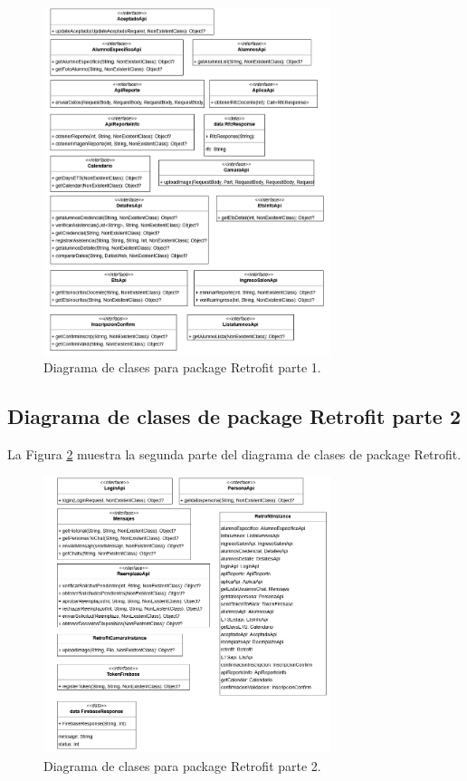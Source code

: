 \begin{figure}[htbp!]
	\begin{center}
		\includegraphics[width=0.75\textwidth]{DiagramasMoviles/DCM (10)}
		\caption{Diagrama de clases para package Retrofit parte 1.}
		\label{fig:Retrofit1}
	\end{center}
\end{figure}

\newpage

\subsection{Diagrama de clases de package Retrofit parte 2}

La Figura \ref{fig:Retrofit2} muestra la segunda parte del diagrama de clases de package Retrofit.

\begin{figure}[htbp!]
	\begin{center}
		\includegraphics[width=0.75\textwidth]{DiagramasMoviles/DCM (11)}
		\caption{Diagrama de clases para package Retrofit parte 2.}
		\label{fig:Retrofit2}
	\end{center}
\end{figure}

\newpage